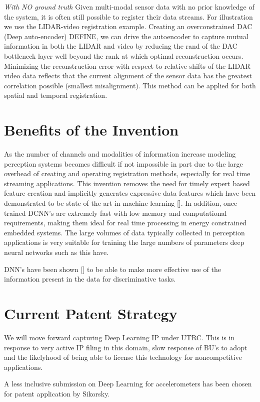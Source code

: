 \documentclass{article}
\begin{document}
\emph{With NO ground truth}
Given multi-modal sensor data with no prior knowledge of the system, it is often still possible to register their data streams. For illustration we use the LIDAR-video registration example. Creating an overconstrained DAC (Deep auto-encoder) DEFINE, we can drive the autoencoder to capture mutual information in both the LIDAR and video by reducing the rand of the DAC bottleneck layer well beyond the rank at which optimal reconstruction occurs. Minimizing the reconstruction error with respect to relative shifts of the LIDAR video data reflects that the current alignment of the sensor data has the greatest correlation possible (smallest misalignment). This method can be applied for both spatial and temporal registration. 


\section{Benefits of the Invention}
As the number of channels and modalities of information increase modeling perception systems becomes difficult if not impossible in part due to the large overhead of creating and operating registration methods, especially for real time streaming applications. This invention removes the need for timely expert based feature creation and implicitly generates expressive data features which have been demonstrated to be state of the art in machine learning []. In addition, once trained DCNN's are extremely fast with low memory and computational requirements, making them ideal for real time processing in energy constrained embedded systems.  The large volumes
of data typically collected in perception applications is very suitable for training the large numbers of parameters deep neural networks such as this have.  

DNN's have been shown [] to be able to make more effective use of the information present in the data for discriminative tasks.

\section{Current Patent Strategy}
We will move forward capturing Deep Learning IP under UTRC. This is in response to very active IP filing in this domain, slow  response of BU's to adopt and the likelyhood of being able to license this technology for noncompetitive applications.

A less inclusive submission on Deep Learning for accelerometers has been chosen for patent application by Sikorsky. 
\end{document}

